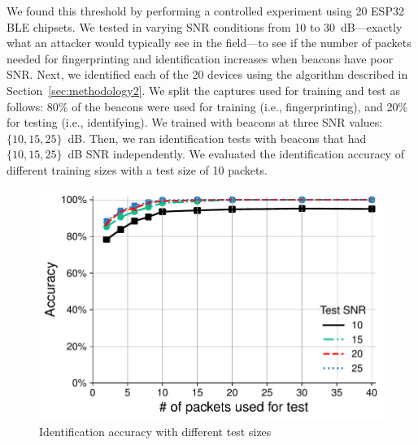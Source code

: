 We
found this threshold by performing a controlled experiment using 
20 ESP32 BLE chipsets. We tested in varying SNR conditions from 10
to 30~dB---exactly what an attacker would typically see in the field---to
see if the number of packets needed for fingerprinting and identification increases when 
beacons have poor SNR.
Next, we identified each of the 20 devices using the algorithm
described in Section~\ref{sec:methodology2}. We split the captures used for
training and test as follows: 80\% of the beacons were used for training (i.e., fingerprinting), and
20\% for testing (i.e., identifying).  We trained with beacons at three SNR values:
$\{10,15,25\}$~dB. Then, we ran identification tests with beacons that had $\{10,15,25\}$~dB SNR
independently. We evaluated the identification accuracy of different training sizes with a test size of 10
packets. %



\begin{figure}
    \centering
    \includegraphics[width=\linewidth]{bletracking/plots/accuracy_esp_test2.pdf}
    \caption{Identification accuracy with different test sizes}
    \label{fig:esp_test}
\end{figure}


